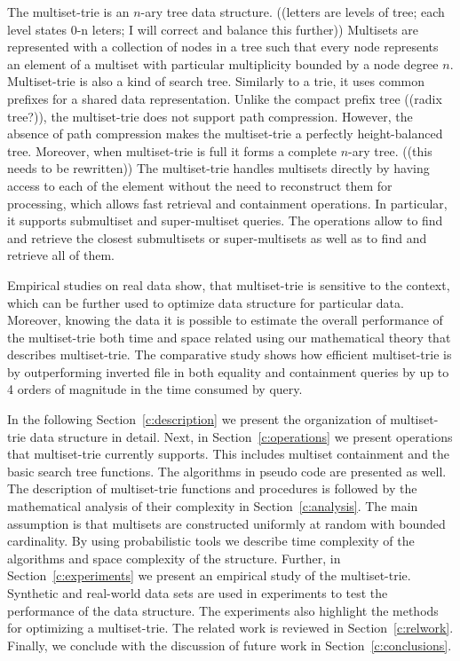 The multiset-trie is an $n$-ary tree data structure. ((letters are levels of tree; each level states 0-n leters; I will correct and balance this further)) Multisets are represented with a collection of nodes in a tree such that every node represents an element of a multiset with particular multiplicity bounded by a node degree $n.$
%
Multiset-trie is also a kind of search tree. Similarly to a trie, it uses common prefixes for a shared data representation. Unlike the compact prefix tree \cite{patriciaTree} ((radix tree?)), the multiset-trie does not support path compression. However, the absence of path compression makes the multiset-trie a perfectly height-balanced tree. Moreover, when multiset-trie is full it forms a complete $n$-ary tree.
%
((this needs to be rewritten)) The multiset-trie handles multisets directly by having access to each of the element without the need to reconstruct them for processing, which allows fast retrieval and containment operations. In particular, it supports submultiset and super-multiset queries. The operations allow to find and retrieve the closest submultisets or super-multisets as well as to find and retrieve all of them.


Empirical studies on real data show, that multiset-trie is sensitive to the context, which can 
be further used to optimize data structure for particular data. Moreover, knowing the data 
it is possible to estimate the overall performance of the multiset-trie both time and space 
related using our mathematical theory that describes multiset-trie.
%
The comparative study shows how efficient multiset-trie is by outperforming inverted file in 
both equality and containment queries by up to 4 orders of magnitude in the time consumed by 
query. 


%
In the following Section~\ref{c:description} we present the organization of 
multiset-trie data structure in detail.
%
Next, in Section~\ref{c:operations} we present operations that multiset-trie currently 
supports. This includes multiset containment and the basic search tree functions. 
The algorithms in pseudo code are presented as well. 
%
The description of multiset-trie functions and procedures is followed by the 
mathematical analysis of their complexity in Section~\ref{c:analysis}. 
The main assumption is that multisets are constructed uniformly at random 
with bounded cardinality. By using probabilistic tools we describe time complexity of 
the algorithms and space complexity of the structure.
%
Further, in Section~\ref{c:experiments} we present an empirical study of the 
multiset-trie. Synthetic and real-world data sets are used in experiments to test the performance 
of the data structure. The experiments also highlight the methods for optimizing a multiset-trie.
%
The related work is reviewed in Section~\ref{c:relwork}. 
%
Finally, we conclude with the discussion of future work in Section~\ref{c:conclusions}.
%